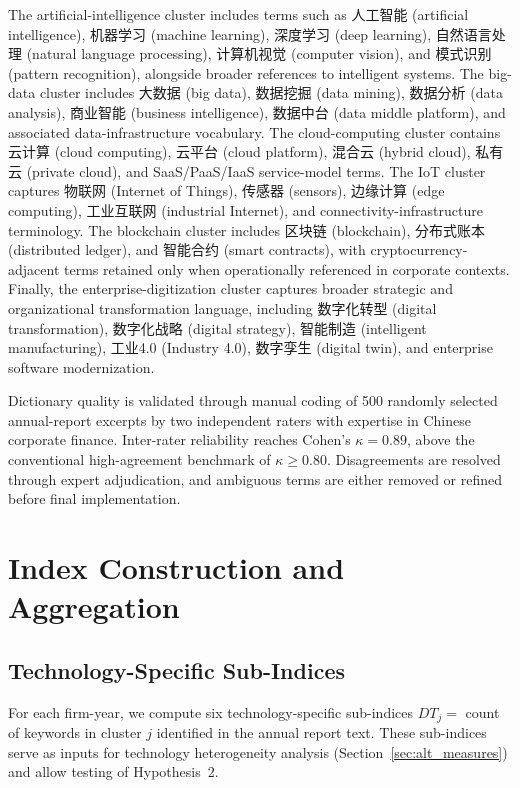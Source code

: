 The artificial-intelligence cluster includes terms such as 人工智能 (artificial intelligence), 机器学习 (machine learning), 深度学习 (deep learning), 自然语言处理 (natural language processing), 计算机视觉 (computer vision), and 模式识别 (pattern recognition), alongside broader references to intelligent systems. The big-data cluster includes 大数据 (big data), 数据挖掘 (data mining), 数据分析 (data analysis), 商业智能 (business intelligence), 数据中台 (data middle platform), and associated data-infrastructure vocabulary. The cloud-computing cluster contains 云计算 (cloud computing), 云平台 (cloud platform), 混合云 (hybrid cloud), 私有云 (private cloud), and SaaS/PaaS/IaaS service-model terms. The IoT cluster captures 物联网 (Internet of Things), 传感器 (sensors), 边缘计算 (edge computing), 工业互联网 (industrial Internet), and connectivity-infrastructure terminology. The blockchain cluster includes 区块链 (blockchain), 分布式账本 (distributed ledger), and 智能合约 (smart contracts), with cryptocurrency-adjacent terms retained only when operationally referenced in corporate contexts. Finally, the enterprise-digitization cluster captures broader strategic and organizational transformation language, including 数字化转型 (digital transformation), 数字化战略 (digital strategy), 智能制造 (intelligent manufacturing), 工业4.0 (Industry 4.0), 数字孪生 (digital twin), and enterprise software modernization.

Dictionary quality is validated through manual coding of 500 randomly selected annual-report excerpts by two independent raters with expertise in Chinese corporate finance. Inter-rater reliability reaches Cohen's $\kappa = 0.89$, above the conventional high-agreement benchmark of $\kappa \geq 0.80$. Disagreements are resolved through expert adjudication, and ambiguous terms are either removed or refined before final implementation.

\section{Index Construction and Aggregation}

\subsection{Technology-Specific Sub-Indices}

For each firm-year, we compute six technology-specific sub-indices $DT_j = $ count of keywords in cluster $j$ identified in the annual report text. These sub-indices serve as inputs for technology heterogeneity analysis (Section~\ref{sec:alt_measures}) and allow testing of Hypothesis~2.

